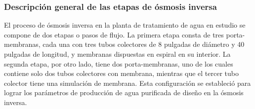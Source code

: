 \subsubsection{Descripción general de las etapas de ósmosis inversa}

El proceso de ósmosis inversa en la planta de tratamiento de agua en estudio se compone de dos etapas o pasos de flujo. La primera etapa consta de tres porta-membranas, cada una con tres tubos colectores de 8 pulgadas de diámetro y 40 pulgadas de longitud, y membranas dispuestas en espiral en su interior. La segunda etapa, por otro lado, tiene dos porta-membranas, uno de los cuales contiene solo dos tubos colectores con membrana, mientras que el tercer tubo colector tiene una simulación de membrana. Esta configuración se estableció para lograr los parámetros de producción de agua purificada de diseño en la ósmosis inversa.\\
